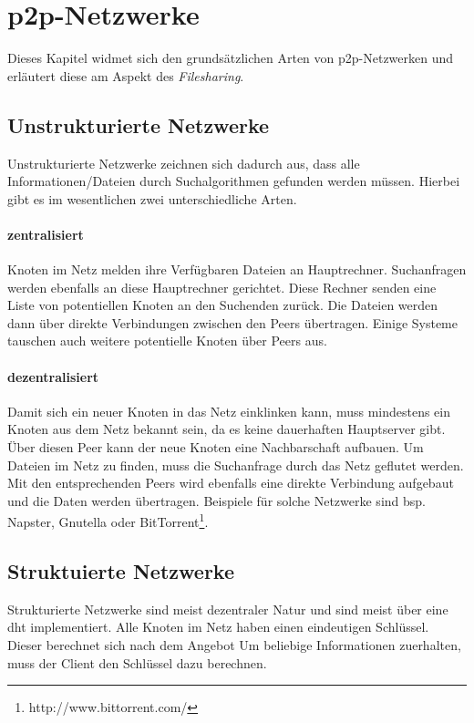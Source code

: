 \section{p2p-Netzwerke}
Dieses Kapitel widmet sich den grundsätzlichen Arten von p2p-Netzwerken und erläutert diese am Aspekt des \emph{Filesharing}. 

\subsection{Unstrukturierte Netzwerke}
Unstrukturierte Netzwerke zeichnen sich dadurch aus, dass alle Informationen/Dateien durch Suchalgorithmen gefunden werden müssen. Hierbei gibt es im wesentlichen zwei unterschiedliche Arten.

\paragraph{zentralisiert} Knoten im Netz melden ihre Verfügbaren Dateien an Hauptrechner. Suchanfragen werden ebenfalls an diese Hauptrechner gerichtet. Diese Rechner senden eine Liste von potentiellen Knoten an den Suchenden zurück. Die Dateien werden dann über direkte Verbindungen zwischen den Peers übertragen. Einige Systeme tauschen auch weitere potentielle Knoten über Peers aus.

\paragraph{dezentralisiert} Damit sich ein neuer Knoten in das Netz einklinken kann, muss mindestens ein Knoten aus dem Netz bekannt sein, da es keine dauerhaften Hauptserver gibt. Über diesen Peer kann der neue Knoten eine Nachbarschaft aufbauen. Um Dateien im Netz zu finden, muss die Suchanfrage durch das Netz geflutet werden. Mit den entsprechenden Peers wird ebenfalls eine direkte Verbindung aufgebaut und die Daten werden übertragen.
Beispiele für solche Netzwerke sind bsp. Napster, Gnutella oder BitTorrent\footnote{http://www.bittorrent.com/}.

\subsection{Struktuierte Netzwerke}
Strukturierte Netzwerke sind meist dezentraler Natur und sind meist über eine \ac{dht} implementiert.
Alle Knoten im Netz haben einen eindeutigen Schlüssel. Dieser berechnet sich nach dem Angebot
Um beliebige Informationen zuerhalten, muss der Client den Schlüssel dazu berechnen.

